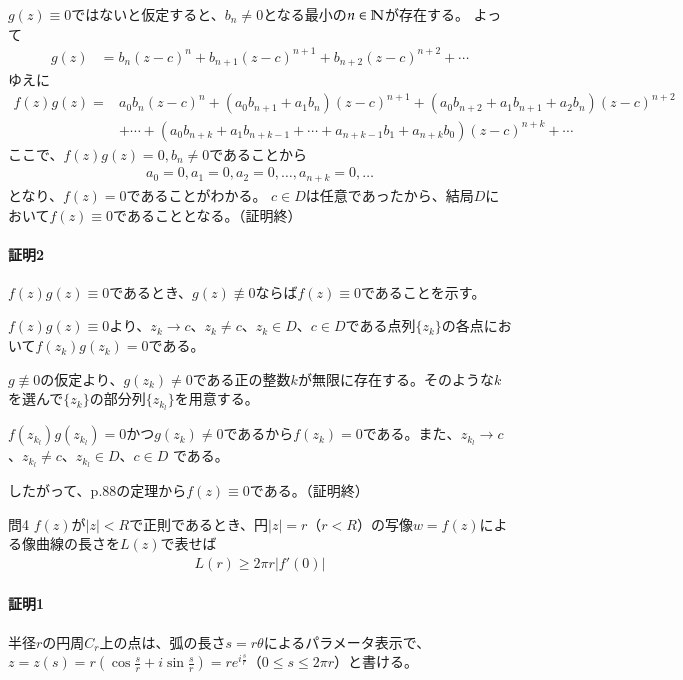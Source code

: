 $g(z)\equiv0$ではないと仮定すると、$b_n\neq0$となる最小の$n\in\mathbb{N}$が存在する。
よって
\begin{align*}
    g(z)&=b_n(z-c)^n+b_{n+1}(z-c)^{n+1}+b_{n+2}(z-c)^{n+2}+\cdots
\end{align*}
ゆえに
\begin{align*}
    f(z)g(z)=&a_0b_n(z-c)^n+(a_0b_{n+1}+a_1b_n)(z-c)^{n+1}
    +(a_0b_{n+2}+a_1b_{n+1}+a_2b_n)(z-c)^{n+2}\\
    &+\cdots+(a_0b_{n+k}+a_1b_{n+k-1}+\cdots+a_{n+k-1}b_1+a_{n+k}b_0)(z-c)^{n+k}+\cdots
\end{align*}
ここで、$f(z)g(z)=0,b_n\neq0$であることから
\begin{align*}
    a_0=0,a_1=0,a_2=0,\dots,a_{n+k}=0,\dots
\end{align*}
となり、$f(z)=0$であることがわかる。
$c\in D$は任意であったから、結局$D$において$f(z)\equiv0$であることとなる。（証明終）

\paragraph{証明2}
$f(z)g(z)\equiv0$であるとき、$g(z)\not\equiv0$ならば$f(z)\equiv0$であることを示す。

$f(z)g(z)\equiv0$より、$z_k\to c$、$z_k\neq c$、$z_k\in D$、$c\in D$である点列$\{z_k\}$の各点において$f(z_k)g(z_k)=0$である。

$g\not\equiv0$の仮定より、$g(z_k)\neq0$である正の整数$k$が無限に存在する。そのような$k$を選んで$\{z_k\}$の部分列$\{z_{k_l}\}$を用意する。

$f(z_{k_l})g(z_{k_l})=0$かつ$g(z_k)\neq0$であるから$f(z_k)=0$である。また、$z_{k_l}\to c$、$z_{k_l}\neq c$、$z_{k_l}\in D$、$c\in D$
である。

したがって、p.88の定理から$f(z)\equiv0$である。（証明終）

\begin{mysimplebox}{問4}
    $f(z)$が$|z|<R$で正則であるとき、円$|z|=r$（$r<R$）の写像$w=f(z)$による像曲線の長さを$L(z)$で表せば
    \begin{align*}
        L(r)\ge2\pi r|f'(0)|
    \end{align*}
\end{mysimplebox}
\paragraph{証明1}
半径$r$の円周$C_r$上の点は、弧の長さ$s=r\theta$によるパラメータ表示で、$z=z(s)=r\left(\cos\frac{s}{r}+i\sin\frac{s}{r}\right)=re^{i\frac{s}{r}}$（$0\le s \le2\pi r$）と書ける。

